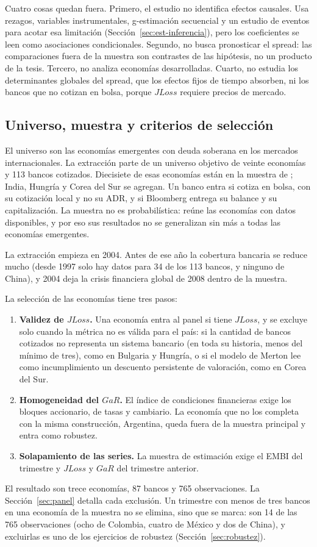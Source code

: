 Cuatro cosas quedan fuera. Primero, el estudio no identifica efectos causales. Usa rezagos, variables instrumentales, g-estimación secuencial y un estudio de eventos para acotar esa limitación (Sección~\ref{sec:est-inferencia}), pero los coeficientes se leen como asociaciones condicionales. Segundo, no busca pronosticar el spread: las comparaciones fuera de la muestra son contrastes de las hipótesis, no un producto de la tesis. Tercero, no analiza economías desarrolladas. Cuarto, no estudia los determinantes globales del spread, que los efectos fijos de tiempo absorben, ni los bancos que no cotizan en bolsa, porque $JLoss$ requiere precios de mercado.

\subsection{Universo, muestra y criterios de selección}
\label{sec:muestra}

El universo son las economías emergentes con deuda soberana en los mercados internacionales. La extracción parte de un universo objetivo de veinte economías y 113 bancos cotizados. Diecisiete de esas economías están en la muestra de \citet{Chari2024b}; India, Hungría y Corea del Sur se agregan. Un banco entra si cotiza en bolsa, con su cotización local y no su ADR, y si Bloomberg entrega su balance y su capitalización. La muestra no es probabilística: reúne las economías con datos disponibles, y por eso sus resultados no se generalizan sin más a todas las economías emergentes.

La extracción empieza en 2004. Antes de ese año la cobertura bancaria se reduce mucho (desde 1997 solo hay datos para 34 de los 113 bancos, y ninguno de China), y 2004 deja la crisis financiera global de 2008 dentro de la muestra.

La selección de las economías tiene tres pasos:
\begin{enumerate}
    \item \textbf{Validez de $JLoss$.} Una economía entra al panel si tiene $JLoss$, y se excluye solo cuando la métrica no es válida para el país: si la cantidad de bancos cotizados no representa un sistema bancario (en toda su historia, menos del mínimo de tres), como en Bulgaria y Hungría, o si el modelo de Merton lee como incumplimiento un descuento persistente de valoración, como en Corea del Sur.
    \item \textbf{Homogeneidad del $GaR$.} El índice de condiciones financieras exige los bloques accionario, de tasas y cambiario. La economía que no los completa con la misma construcción, Argentina, queda fuera de la muestra principal y entra como robustez.
    \item \textbf{Solapamiento de las series.} La muestra de estimación exige el EMBI del trimestre y $JLoss$ y $GaR$ del trimestre anterior.
\end{enumerate}
El resultado son trece economías, 87 bancos y 765 observaciones. La Sección~\ref{sec:panel} detalla cada exclusión. Un trimestre con menos de tres bancos en una economía de la muestra no se elimina, sino que se marca: son 14 de las 765 observaciones (ocho de Colombia, cuatro de México y dos de China), y excluirlas es uno de los ejercicios de robustez (Sección~\ref{sec:robustez}).

